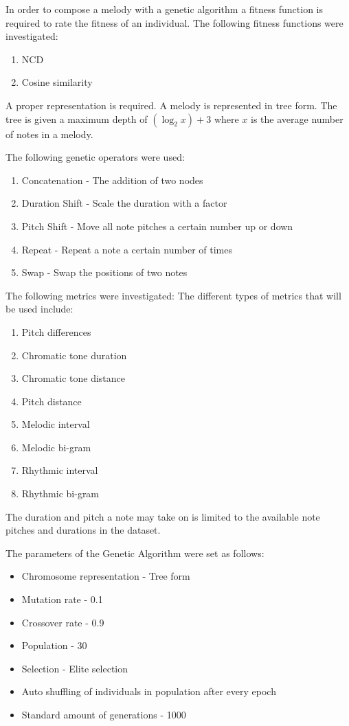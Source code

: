 In order to compose a melody with a genetic algorithm a fitness function is required to rate the fitness of an individual. The following fitness functions were investigated:
\begin{enumerate}
\item \ac{NCD}
\item Cosine similarity
\end{enumerate}

A proper representation is required. A melody is represented in tree form. The tree is given a maximum depth of $(\log_2 x) +  3$ where $x$ is the average number of notes in a melody.

The following genetic operators were used:
\begin{enumerate}
\item Concatenation - The addition of two nodes
\item Duration Shift - Scale the duration with a factor
\item Pitch Shift - Move all note pitches a certain number up or down
\item Repeat - Repeat a note a certain number of times
\item Swap - Swap the positions of two notes
\end{enumerate}

The following metrics were investigated:
The different types of metrics that will be used include:
\begin{enumerate}
\item Pitch differences
\item Chromatic tone duration 
\item Chromatic tone distance 
\item Pitch distance
\item Melodic interval
\item Melodic bi-gram
\item Rhythmic interval 
\item Rhythmic bi-gram
\end{enumerate}

The duration and pitch a note may take on is limited to the available note pitches and durations in the dataset.

The parameters of the Genetic Algorithm were set as follows:
\begin{itemize}
\item Chromosome representation - Tree form
\item Mutation rate - 0.1
\item Crossover rate - 0.9
\item Population - 30
\item Selection - Elite selection
\item Auto shuffling of individuals in population after every epoch
\item Standard amount of generations - 1000
\end{itemize}


